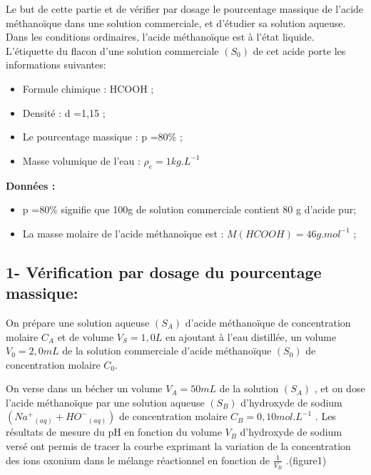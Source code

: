\documentclass[12pt]{article}
\begin{document}
Le but de cette partie et de vérifier par dosage le pourcentage massique de l’acide méthanoïque dans une
solution commerciale, et d’étudier sa solution aqueuse.
Dans les conditions ordinaires, l’acide méthanoïque est à l’état liquide.
L’étiquette du flacon d’une solution commerciale $(S_0)$ de cet acide porte les informations suivantes:
\begin{itemize}
  \item Formule chimique : HCOOH ;
  \item Densité : d =1,15 ;
  \item Le pourcentage massique : p =80\% ;
  \item Masse volumique de l’eau : $\rho_e =1kg.L^{-1}$
\end{itemize}

\textbf{Données :}

\begin{itemize}
  \item  p =80\% signifie que 100g de solution commerciale contient 80 g d’acide pur;
  \item  La masse molaire de l’acide méthanoïque est : $M(HCOOH ) = 46 g.mol^{-1}$ ;
\end{itemize}



\subsection*{1- Vérification par dosage du pourcentage massique:\dotfill}

On prépare une solution aqueuse $(S_A)$ d’acide méthanoïque de concentration molaire $C_A$ et de volume
$V_S =1,0 L$ en ajoutant à l’eau distillée, un volume $V_0 = 2,0 mL$
de la solution commerciale d’acide méthanoïque $(S_0)$ de
concentration molaire $C_0$.

On verse dans un bécher un volume $V_A = 50 mL$ de la solution $(S_A)$ , 
et on dose l’acide méthanoïque par une solution aqueuse $(S_B)$ d’hydroxyde de sodium $({Na^{+}}_{(aq)} + {HO^{-}}_{(aq)})$
 de concentration  molaire $C_B = 0,10 mol.L^{-1}$ . Les résultats de mesure du pH en
fonction du volume $V_B$ d’hydroxyde de sodium versé ont permis
de tracer la courbe exprimant la variation de la concentration des
ions oxonium dans le mélange réactionnel en fonction de $\frac{1}{V_B}$
 .(figure1)
\end{document}
